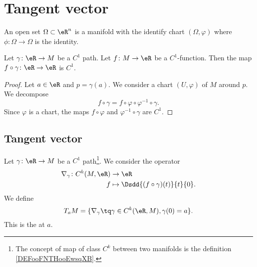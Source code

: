 \section{Tangent vector}


\begin{definition}
	An open set \( \Omega\subset \eR^n\) is a manifold with the identify chart \( (\Omega, \varphi)\) where \( \phi\colon \Omega\to \Omega\) is the identity.
\end{definition}

\begin{lemma}
	Let \( \gamma\colon \eR\to M\) be a \( C^1\) path. Let \( f\colon M\to \eR\) be a \( C^1\)-function. Then the map \( f\circ \gamma\colon \eR\to \eR\) is \( C^1\).
\end{lemma}

\begin{proof}
	Let \( a\in \eR\) and \( p=\gamma(a)\). We consider a chart \( (U,\varphi)\) of \( M\) around \( p\). We decompose
	\begin{equation}
		f\circ \gamma= f\circ \varphi\circ \varphi^{-1}\circ\gamma.
	\end{equation}
	Since \( \varphi\) is a chart, the maps \( f\circ\varphi\) and \( \varphi^{-1}\circ\gamma\) are \( C^1\).
\end{proof}


\subsection{Tangent vector}

\begin{definition}      \label{DEFooJJVIooDUBwDJ}
	Let \( \gamma\colon \eR\to M\) be a \( C^1\) path\footnote{The concept of map of class \( C^k\) between two manifolds is the definition \ref{DEFooFNTHooEwsqXB}.}. We consider the operator
	\begin{equation}
		\begin{aligned}
			\nabla_{\gamma}\colon C^k(M,\eR) & \to \eR                                   \\
			f                                & \mapsto \Dsdd{ (f\circ\gamma)(t) }{t}{0}.
		\end{aligned}
	\end{equation}
	We define
	\begin{equation}
		T_aM=\{ \nabla_{\gamma}\tq \gamma\in C^k(\eR,M),\gamma(0)=a \}.
	\end{equation}
	This is the  at \( a\).
\end{definition}

